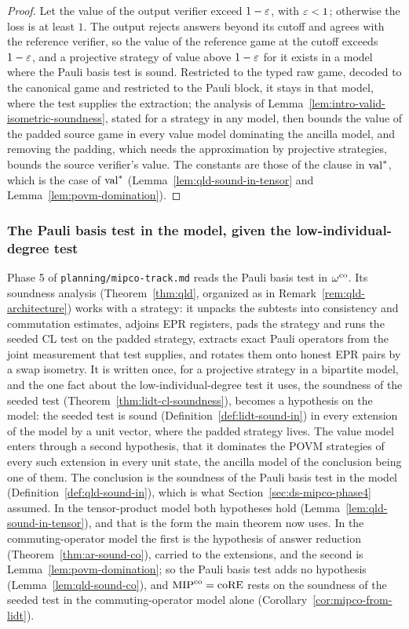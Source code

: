 \begin{proof}
\leanok
Let the value of the output verifier exceed $1 - \varepsilon$, with $\varepsilon < 1$; otherwise the loss is at
least $1$. The output rejects answers beyond its cutoff and agrees with the reference verifier, so
the value of the reference game at the cutoff exceeds $1 - \varepsilon$, and a projective strategy of
value above $1 - \varepsilon$ for it exists in a model where the Pauli basis test is sound. Restricted to
the typed raw game, decoded to the canonical game and restricted to the Pauli block, it stays in
that model, where the test supplies the extraction; the analysis of
Lemma~\ref{lem:intro-valid-isometric-soundness}, stated for a strategy in any model, then bounds
the value of the padded source game in every value model dominating the ancilla model, and removing
the padding, which needs the approximation by projective strategies, bounds the source verifier's
value. The constants are those of the clause in $\mathrm{val}^*$, which is the case of $\mathrm{val}^*$
(Lemma~\ref{lem:qld-sound-in-tensor} and Lemma~\ref{lem:povm-domination}).
\end{proof}

\subsubsection{The Pauli basis test in the model, given the low-individual-degree test}
\label{sec:ds-mipco-phase5}

Phase 5 of \texttt{planning/mipco-track.md} reads the Pauli basis test in $\omega^{\mathrm{co}}$. Its soundness
analysis (Theorem~\ref{thm:qld}, organized as in Remark~\ref{rem:qld-architecture}) works with a
strategy: it unpacks the subtests into consistency and commutation estimates, adjoins EPR
registers, pads the strategy and runs the seeded CL test on the padded strategy, extracts exact
Pauli operators from the joint measurement that test supplies, and rotates them onto honest EPR
pairs by a swap isometry. It is written once, for a projective strategy in a bipartite model, and
the one fact about the low-individual-degree test it uses, the soundness of the seeded test
(Theorem~\ref{thm:lidt-cl-soundness}), becomes a hypothesis on the model: the seeded test is sound
(Definition~\ref{def:lidt-sound-in}) in every extension of the model by a unit vector, where the
padded strategy lives. The value model enters through a second hypothesis, that it dominates the
POVM strategies of every such extension in every unit state, the ancilla model of the conclusion
being one of them. The conclusion is the soundness of the Pauli basis test in the model
(Definition~\ref{def:qld-sound-in}), which is what Section~\ref{sec:ds-mipco-phase4} assumed. In
the tensor-product model both hypotheses hold (Lemma~\ref{lem:qld-sound-in-tensor}), and that is
the form the main theorem now uses. In the commuting-operator model the first is the hypothesis of
answer reduction (Theorem~\ref{thm:ar-sound-co}), carried to the extensions, and the second is
Lemma~\ref{lem:povm-domination}; so the Pauli basis test adds no hypothesis
(Lemma~\ref{lem:qld-sound-co}), and $\mathrm{MIP}^{\mathrm{co}} = \mathrm{coRE}$ rests on the soundness of the seeded test in
the commuting-operator model alone (Corollary~\ref{cor:mipco-from-lidt}).

